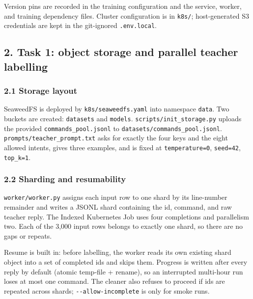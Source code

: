 \documentclass[
]{article}
\begin{document}
Version pins are recorded in the training configuration and the service,
worker, and training dependency files. Cluster configuration is in
\texttt{k8s/}; host-generated S3 credentials are kept in the git-ignored
\texttt{.env.local}.

\hypertarget{task-1-object-storage-and-parallel-teacher-labelling}{%
\subsection{2. Task 1: object storage and parallel teacher
labelling}\label{task-1-object-storage-and-parallel-teacher-labelling}}

\hypertarget{storage-layout}{%
\subsubsection{2.1 Storage layout}\label{storage-layout}}

SeaweedFS is deployed by \texttt{k8s/seaweedfs.yaml} into namespace
\texttt{data}. Two buckets are created: \texttt{datasets} and
\texttt{models}. \texttt{scripts/init\_storage.py} uploads the provided
\texttt{commands\_pool.jsonl} to \texttt{datasets/commands\_pool.jsonl}.
\texttt{prompts/teacher\_prompt.txt} asks for exactly the four keys and
the eight allowed intents, gives three examples, and is fixed at
\texttt{temperature=0}, \texttt{seed=42}, \texttt{top\_k=1}.

\hypertarget{sharding-and-resumability}{%
\subsubsection{2.2 Sharding and
resumability}\label{sharding-and-resumability}}

\texttt{worker/worker.py} assigns each input row to one shard by its
line-number remainder and writes a JSONL shard containing the id,
command, and raw teacher reply. The Indexed Kubernetes Job uses four
completions and parallelism two. Each of the 3,000 input rows belongs to
exactly one shard, so there are no gaps or repeats.

Resume is built in: before labelling, the worker reads its own existing
shard object into a set of completed ids and skips them. Progress is
written after every reply by default (atomic temp-file + rename), so an
interrupted multi-hour run loses at most one command. The cleaner also
refuses to proceed if ids are repeated across shards;
\texttt{-\/-allow-incomplete} is only for smoke runs.
\end{document}
